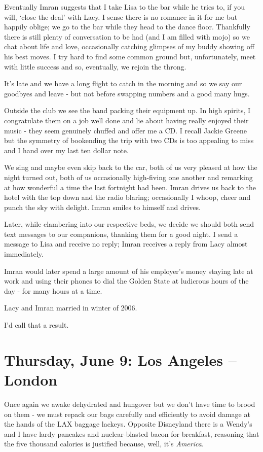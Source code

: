 \documentclass[a5paper,titlepage,11pt]{book}
\begin{document}
Eventually Imran suggests that I take Lisa to the bar while he tries to, if you will, `close the deal' with Lacy. I sense there is no romance in it for me but happily oblige; we go to the bar while they head to the dance floor. Thankfully there is still plenty of conversation to be had (and I am filled with mojo) so we chat about life and love, occasionally catching glimpses of my buddy showing off his best moves. I try hard to find some common ground but, unfortunately, meet with little success and so, eventually, we rejoin the throng.

It's late and we have a long flight to catch in the morning and so we say our goodbyes and leave - but not before swapping numbers and a good many hugs.

Outside the club we see the band packing their equipment up. In high spirits, I congratulate them on a job well done and lie about having really enjoyed their music - they seem genuinely chuffed and offer me a CD. I recall Jackie Greene but the symmetry of bookending the trip with two CDs is too appealing to miss and I hand over my last ten dollar note.

We sing and maybe even skip back to the car, both of us very pleased at how the night turned out, both of us occasionally high-fiving one another and remarking at how wonderful a time the last fortnight had been. Imran drives us back to the hotel with the top down and the radio blaring; occasionally I whoop, cheer and punch the sky with delight. Imran smiles to himself and drives.

Later, while clambering into our respective beds, we decide we should both send text messages to our companions, thanking them for a good night. I send a message to Lisa and receive no reply; Imran receives a reply from Lacy almost immediately.

Imran would later spend a large amount of his employer's money staying late at work and using their phones to dial the Golden State at ludicrous hours of the day - for many hours at a time.

Lacy and Imran married in winter of 2006.

I'd call that a result.


\chapter[Los Angeles -- London]{Thursday, June 9: Los Angeles -- London}
Once again we awake dehydrated and hungover but we don't have time to brood on them - we must repack our bags carefully and efficiently to avoid damage at the hands of the LAX baggage lackeys. Opposite Disneyland there is a Wendy's and I have lardy pancakes and nuclear-blasted bacon for breakfast, reasoning that the five thousand calories is justified because, well, it's \emph{America}.
\end{document}
